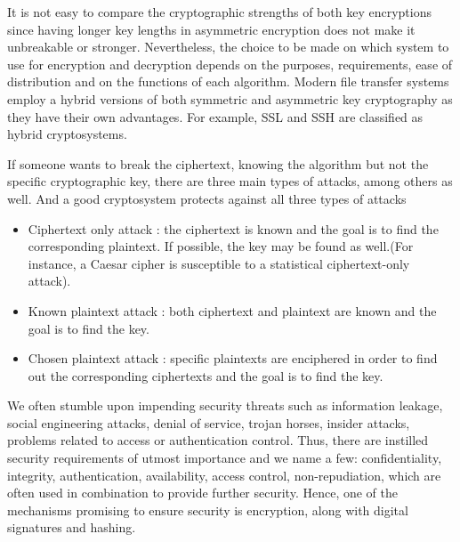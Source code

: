 It is not easy to compare the cryptographic strengths of both key encryptions since having longer key lengths in asymmetric encryption does not make it unbreakable or stronger. Nevertheless, the choice to be made on which system to use for encryption and decryption depends on the purposes, requirements, ease of distribution and on the functions of each algorithm. Modern file transfer systems employ a hybrid versions of both symmetric and asymmetric key cryptography as they have their own advantages. For example, SSL and SSH are classified as hybrid cryptosystems. 

If someone wants to break the ciphertext, knowing the algorithm but not the specific cryptographic key, there are three main types of attacks, among others as well. And a good cryptosystem protects against all three types of attacks \cite{stallings2017} 
\begin{itemize}
\item Ciphertext only attack : the ciphertext is known and the goal is to find the corresponding plaintext. If possible, the key may be found as well.(For instance, a Caesar cipher is susceptible to a statistical ciphertext-only attack).
\end{itemize}
\begin{itemize}
\item Known plaintext attack : both ciphertext and plaintext are known and the goal is to find the key.
\end{itemize}
\begin{itemize}
\item Chosen plaintext attack : specific plaintexts are enciphered in order to find out the corresponding ciphertexts and the goal is to find the key.
\end{itemize}


We often stumble upon impending security threats such as information leakage, social engineering attacks, denial of service, trojan horses, insider attacks, problems related to access or authentication control. Thus, there are instilled security requirements of utmost importance and we name a few: confidentiality, integrity, authentication, availability, access control, non-repudiation, which are often used in combination to provide further security. Hence, one of the mechanisms promising to ensure security is encryption, along with digital signatures and hashing. 



